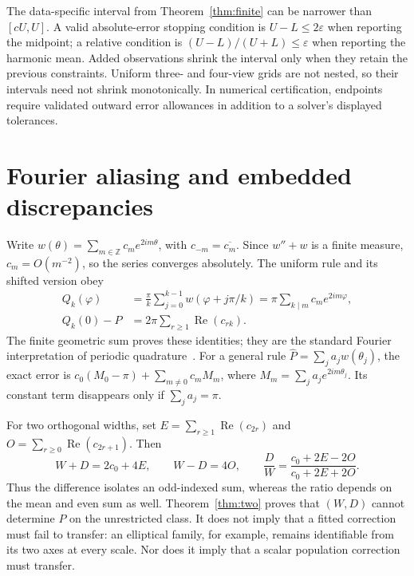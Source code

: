 \documentclass[11pt,a4paper]{article}
\DeclareMathOperator{\Rea}{Re}
\begin{document}
The data-specific interval from Theorem~\ref{thm:finite} can be narrower than $[cU,U]$. A valid absolute-error stopping condition is $U-L\le2\varepsilon$ when reporting the midpoint; a relative condition is $(U-L)/(U+L)\le\varepsilon$ when reporting the harmonic mean. Added observations shrink the interval only when they retain the previous constraints. Uniform three- and four-view grids are not nested, so their intervals need not shrink monotonically. In numerical certification, endpoints require validated outward error allowances in addition to a solver's displayed tolerances.

\section{Fourier aliasing and embedded discrepancies}
Write $w(\theta)=\sum_{m\in\mathbb Z}c_m e^{2im\theta}$, with $c_{-m}=\overline{c_m}$. Since $w''+w$ is a finite measure, $c_m=O(m^{-2})$, so the series converges absolutely. The uniform rule and its shifted version obey
\begin{align}
Q_k(\varphi)&=\frac\pi k\sum_{j=0}^{k-1}w(\varphi+j\pi/k)
=\pi\sum_{k\mid m}c_m e^{2im\varphi},\label{eq:alias}\\
Q_k(0)-P&=2\pi\sum_{r\ge1}\Rea(c_{rk}).\nonumber
\end{align}
The finite geometric sum proves these identities; they are the standard Fourier interpretation of periodic quadrature~\cite{trefethen}. For a general rule $\widehat P=\sum_j a_jw(\theta_j)$, the exact error is $c_0(M_0-\pi)+\sum_{m\ne0}c_mM_m$, where $M_m=\sum_j a_je^{2im\theta_j}$. Its constant term disappears only if $\sum_j a_j=\pi$.

For two orthogonal widths, set $E=\sum_{r\ge1}\Rea(c_{2r})$ and $O=\sum_{r\ge0}\Rea(c_{2r+1})$. Then
\begin{equation}
W+D=2c_0+4E,\qquad W-D=4O,\qquad
\frac DW=\frac{c_0+2E-2O}{c_0+2E+2O}.
\end{equation}
Thus the difference isolates an odd-indexed sum, whereas the ratio depends on the mean and even sum as well. Theorem~\ref{thm:two} proves that $(W,D)$ cannot determine $P$ on the unrestricted class. It does not imply that a fitted correction must fail to transfer: an elliptical family, for example, remains identifiable from its two axes at every scale. Nor does it imply that a scalar population correction must transfer.
\end{document}
